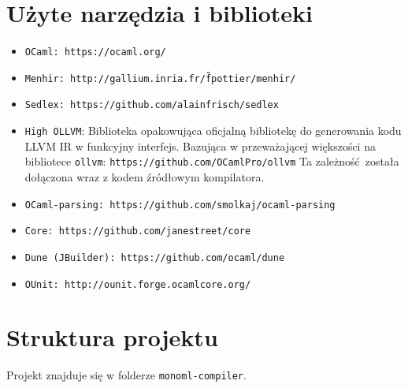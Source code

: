 \documentclass[declaration,shortabstract]{iithesis}
\begin{document}
\section{Użyte narzędzia i biblioteki}

\begin{itemize}
  \item \texttt{OCaml: https://ocaml.org/}
  \item \texttt{Menhir: http://gallium.inria.fr/\~fpottier/menhir/}
  \item \texttt{Sedlex: https://github.com/alainfrisch/sedlex}
  \item \texttt{High OLLVM}: Biblioteka opakowująca oficjalną bibliotekę do 
  generowania kodu LLVM IR w funkcyjny interfejs. Bazująca w przeważającej większości 
  na bibliotece \texttt{ollvm}: 
  \texttt{https://github.com/OCamlPro/ollvm}
  Ta zależność została dołączona wraz z kodem źródłowym kompilatora.
  \item \texttt{OCaml-parsing: https://github.com/smolkaj/ocaml-parsing}
  \item \texttt{Core: https://github.com/janestreet/core} 
  \item \texttt{Dune (JBuilder): https://github.com/ocaml/dune} 
  \item \texttt{OUnit: http://ounit.forge.ocamlcore.org/} 
\end{itemize}



\section{Struktura projektu}

Projekt znajduje się w folderze \texttt{monoml-compiler}.
\end{document}
